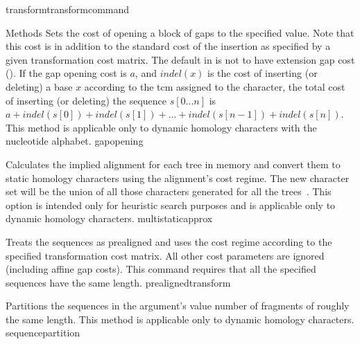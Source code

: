 \begin{command}{transform}{transformcommand}
\begin{arguments}
\begin{argumentgroup}{Methods}
            {Sets the cost of opening a block of gaps to the specified value. Note that
            this cost is in addition to the standard cost of the insertion as
            specified by a given transformation cost matrix.
            The default in \poy is not to have extension
            gap cost (). If the gap
            opening cost is
            $a$, and $indel(x)$ is the cost of inserting (or deleting) a
            base $x$ according to the tcm assigned to the character, the total
            cost of inserting (or deleting) the sequence $s[0...n]$ is $a +
            indel(s[0]) + indel(s[1]) + ... + indel(s[n - 1]) + indel(s[n]).$
            This method is applicable only to dynamic homology characters with
            the nucleotide alphabet.} 
            {gapopening}

            {Calculates the implied alignment for each tree in memory
            and convert them to static homology characters using the alignment's
            cost regime. The new character set will be the union of all those
            characters generated for all the trees~\cite{wheeler1995a}. This option is intended only
            for heuristic search purposes and is applicable only to dynamic homology characters.}
            {multistaticapprox}

                {Treats the sequences as prealigned and uses the
                cost regime according to the specified transformation cost
                matrix. All other cost parameters are ignored (including affine
                gap costs). This command requires that all the specified sequences have the same length.}
                {prealignedtransform}
            
            {Partitions the sequences in the argument's value number of
            fragments of roughly the same length. This method is applicable only to dynamic homology characters.}
            {sequencepartition}


\end{argumentgroup}
\end{arguments}
\end{command}

